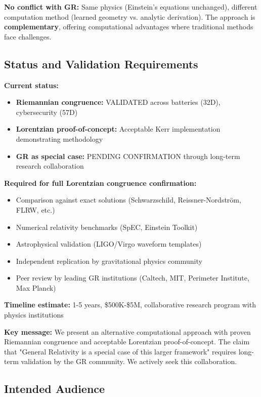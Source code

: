 \documentclass[11pt,a4paper]{article}
\begin{document}
\textbf{No conflict with GR:} Same physics (Einstein's equations unchanged), different computation method (learned geometry vs. analytic derivation). The approach is \textbf{complementary}, offering computational advantages where traditional methods face challenges.

\subsection*{Status and Validation Requirements}

\textbf{Current status:} 
\begin{itemize}
\item \textbf{Riemannian congruence:} VALIDATED across batteries (32D), cybersecurity (57D)
\item \textbf{Lorentzian proof-of-concept:} Acceptable Kerr implementation demonstrating methodology
\item \textbf{GR as special case:} PENDING CONFIRMATION through long-term research collaboration
\end{itemize}

\textbf{Required for full Lorentzian congruence confirmation:}
\begin{itemize}
\item Comparison against exact solutions (Schwarzschild, Reissner-Nordström, FLRW, etc.)
\item Numerical relativity benchmarks (SpEC, Einstein Toolkit)
\item Astrophysical validation (LIGO/Virgo waveform templates)
\item Independent replication by gravitational physics community
\item Peer review by leading GR institutions (Caltech, MIT, Perimeter Institute, Max Planck)
\end{itemize}

\textbf{Timeline estimate:} 1-5 years, \$500K-\$5M, collaborative research program with physics institutions

\textbf{Key message:} We present an alternative computational approach with proven Riemannian congruence and acceptable Lorentzian proof-of-concept. The claim that "General Relativity is a special case of this larger framework" requires long-term validation by the GR community. We actively seek this collaboration.

\subsection*{Intended Audience}
\end{document}
